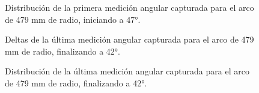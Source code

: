 \begin{figure}[H]
	\centering
	\caption{Distribución de la primera medición angular capturada para el arco de 479 mm de radio, iniciando a 47°.}
	\label{fig:histograma_theta47_8}
\end{figure}

\begin{figure}[H]
	\centering
	\caption{Deltas de la última medición angular capturada para el arco de 479 mm de radio, finalizando a 42°.}
	\label{fig:lecturas_theta42_8}
\end{figure}

\begin{figure}[H]
	\centering
	\caption{Distribución de la última medición angular capturada para el arco de 479 mm de radio, finalizando a 42°.}
	\label{fig:histograma_theta42_8}
\end{figure}

